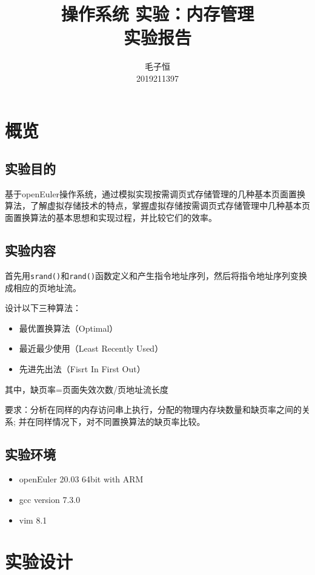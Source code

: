 \documentclass[lang=cn,11pt,a4paper,cite=authornum]{paper}
\title{操作系统 实验：内存管理 \\ 实验报告}
\author{毛子恒 \\ 2019211397}
\institute{北京邮电大学\ 计算机学院}
\date{\zhtoday}
\begin{document}
\maketitle

\section{概览}

\subsection{实验目的}

基于openEuler操作系统，通过模拟实现按需调页式存储管理的几种基本页面置换算法，了解虚拟存储技术的特点，掌握虚拟存储按需调页式存储管理中几种基本页面置换算法的基本思想和实现过程，并比较它们的效率。

\subsection{实验内容}

首先用\texttt{srand()}和\texttt{rand()}函数定义和产生指令地址序列，然后将指令地址序列变换成相应的页地址流。

设计以下三种算法：

\begin{itemize}
    \item 最优置换算法（Optimal）
    \item 最近最少使用（Least Recently Used）
    \item 先进先出法（Fisrt In First Out） 
\end{itemize}

其中，缺页率=页面失效次数/页地址流长度

要求：分析在同样的内存访问串上执行，分配的物理内存块数量和缺页率之间的关系; 并在同样情况下，对不同置换算法的缺页率比较。

\subsection{实验环境}

\begin{itemize}
    \item openEuler 20.03 64bit with ARM
    \item gcc version 7.3.0
    \item vim 8.1
\end{itemize}

\section{实验设计}
\end{document}
